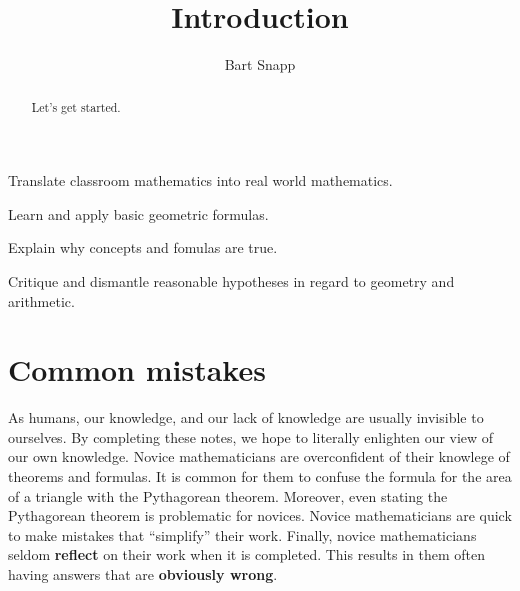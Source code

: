 \documentclass[handout,nooutcomes,noauthor]{ximera}
\title{Introduction}
\author{Bart Snapp}
\begin{document}
\begin{abstract}
  Let's get started.
\end{abstract}
\maketitle


\begin{listSectionOutcomes}
\item Translate classroom mathematics into real world mathematics. %
\item Learn and apply basic geometric formulas.
\item Explain why concepts and fomulas are true.
\item Critique and dismantle reasonable hypotheses in regard to
  geometry and arithmetic.
\end{listSectionOutcomes}




\section{Common mistakes}


As humans, our knowledge, and our lack of knowledge are usually
invisible to ourselves. By completing these notes, we hope to
literally enlighten our view of our own knowledge. Novice
mathematicians are overconfident of their knowlege of theorems and
formulas. It is common for them to confuse the formula for the area of
a triangle with the Pythagorean theorem. Moreover, even stating the
Pythagorean theorem is problematic for novices. Novice mathematicians
are quick to make mistakes that ``simplify'' their work. Finally,
novice mathematicians seldom \textbf{reflect} on their work when it is
completed. This results in them often having answers that are
\textbf{obviously wrong}.
\end{document}
